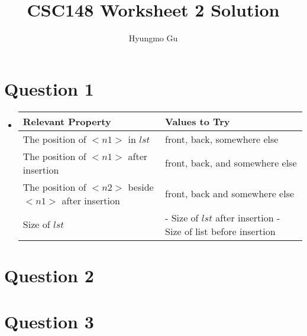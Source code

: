 \documentclass[12pt]{article}
\begin{document}
\title{CSC148 Worksheet 2 Solution}
\author{Hyungmo Gu}
\maketitle

\section*{Question 1}
\begin{itemize}
    \item

    \begin{tabular}{|p{8cm}|p{6cm}|}
        \hline
        Relevant Property & Values to Try\\
        \hline
        The position of $<n1>$ in $lst$ & front, back, somewhere else\\
        \hline
        The position of $<n1>$ after insertion & front, back, and somewhere else\\
        \hline
        The position of $<n2>$ beside $<n1>$ after insertion & front, back and somewhere else\\
        \hline
        Size of $lst$ & - Size of $lst$ after insertion \newline - Size of list before insertion\\
        \hline
    \end{tabular}
\end{itemize}

\section*{Question 2}

\section*{Question 3}
\end{document}
